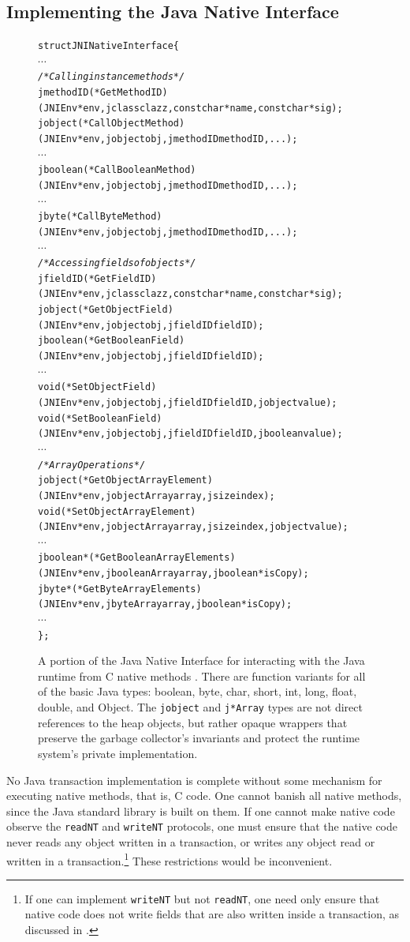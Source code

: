 \subsection{Implementing the Java Native Interface}
\begin{figure}\sis\fontsize{9}{10}\begin{alltt}
struct JNINativeInterface \{
  \(\cdots\)
  \textit{/* Calling instance methods */}
  jmethodID (*GetMethodID)
    (JNIEnv *env, jclass clazz, const char *name, const char *sig);
  jobject (*CallObjectMethod)
    (JNIEnv *env, jobject obj, jmethodID methodID, ...);
  \(\cdots\)
  jboolean (*CallBooleanMethod)
    (JNIEnv *env, jobject obj, jmethodID methodID, ...);
  \(\cdots\)
  jbyte (*CallByteMethod)
    (JNIEnv *env, jobject obj, jmethodID methodID, ...);
  \(\cdots\)
  \textit{/* Accessing fields of objects */}
  jfieldID (*GetFieldID)
    (JNIEnv *env, jclass clazz, const char *name, const char *sig);
  jobject (*GetObjectField)
    (JNIEnv *env, jobject obj, jfieldID fieldID);
  jboolean (*GetBooleanField)
    (JNIEnv *env, jobject obj, jfieldID fieldID);
  \(\cdots\)
  void (*SetObjectField)
    (JNIEnv *env, jobject obj, jfieldID fieldID, jobject value);
  void (*SetBooleanField)
    (JNIEnv *env, jobject obj, jfieldID fieldID, jboolean value);
  \(\cdots\)
  \textit{/* Array Operations */}
  jobject (*GetObjectArrayElement)
    (JNIEnv *env, jobjectArray array, jsize index);
  void (*SetObjectArrayElement)
    (JNIEnv *env, jobjectArray array, jsize index, jobject value);
  \(\cdots\)
  jboolean* (*GetBooleanArrayElements)
    (JNIEnv *env, jbooleanArray array, jboolean *isCopy);
  jbyte* (*GetByteArrayElements)
    (JNIEnv *env, jbyteArray array, jboolean *isCopy);
  \(\cdots\)
\};
\end{alltt}
\caption[A portion of the Java Native Interface] {A portion of the
  Java Native Interface for interacting with the Java runtime from C
  native methods \cite{JNI}\@.  There are function variants for all of the
  basic Java types: boolean, byte, char, short, int, long, float,
  double, and Object.  The \texttt{jobject} and
  \texttt{j*Array} types are not direct references to the heap
  objects, but rather opaque wrappers that preserve the garbage
  collector's invariants and protect the runtime system's private
  implementation.}
\label{fig:jni}
\end{figure}

No Java transaction implementation is complete without some mechanism
for executing native methods, that is, C code.  One cannot banish all
native methods, since the Java standard library is built on them. 
If one cannot make native code observe the \texttt{readNT} and
\texttt{writeNT} protocols, one must ensure that the native code never
reads any object written in a transaction, or writes any object read
or written in a transaction.\footnote{If one
  can implement \texttt{writeNT} but not \texttt{readNT}, one need
  only ensure that native code does not write fields that are also
  written inside a transaction, as discussed in .}
These restrictions would be inconvenient.

